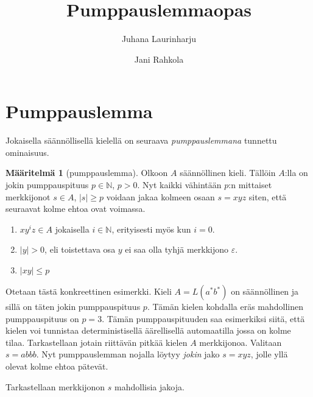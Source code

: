 \documentclass[a4paper,11pt]{article}
\title{Pumppauslemmaopas}
\author{Juhana Laurinharju \and Jani Rahkola}
\theoremstyle{definition}
\newtheorem*{definition}{Määritelmä}
\newcommand{\Nat}{\mathbb{N}}
\begin{document}
\maketitle

\section*{Pumppauslemma}

Jokaisella säännöllisellä kielellä on seuraava \emph{pumppauslemmana} tunnettu
ominaisuus.

\begin{definition}[pumppauslemma]
    Olkoon $A$ säännöllinen kieli. Tällöin $A$:lla on jokin
    pumppauspituus $p \in \Nat$, $p > 0$. Nyt kaikki vähintään $p$:n
    mittaiset merkkijonot $s \in A$, $|s| \geq p$ voidaan jakaa
    kolmeen osaan $s = xyz$ siten, että seuraavat kolme ehtoa ovat
    voimassa.

    \begin{enumerate}
        \item
          $xy^iz \in A$ jokaisella $i \in \Nat$, erityisesti myös kun
          $i = 0$.
        \item
          $|y| > 0$, eli toistettava osa $y$ ei saa olla tyhjä
          merkkijono $\varepsilon$.
        \item
          $|xy| \leq p$
    \end{enumerate}
\end{definition}

Otetaan tästä konkreettinen esimerkki. Kieli $A = L(a^*b^*)$ on säännöllinen ja
sillä on täten jokin pumppauspituus $p$. Tämän kielen kohdalla eräs mahdollinen
pumppauspituus on $p = 3$. Tämän pumppauspituuden saa esimerkiksi siitä, että
kielen voi tunnistaa deterministisellä äärellisellä automaatilla jossa on kolme
tilaa. Tarkastellaan jotain riittävän pitkää kielen $A$ merkkijonoa. Valitaan
$s = abbb$. Nyt pumppauslemman nojalla löytyy \emph{jokin} jako $s = xyz$,
jolle yllä olevat kolme ehtoa pätevät.

Tarkastellaan merkkijonon $s$ mahdollisia jakoja.
\end{document}
